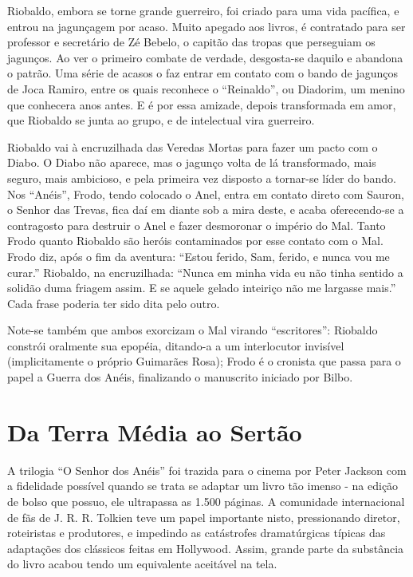 Riobaldo, embora se torne grande guerreiro, foi criado para uma vida
pacífica, e entrou na jagunçagem por acaso. Muito apegado aos livros,
é contratado para ser professor e secretário de Zé Bebelo, o capitão
das tropas que perseguiam os jagunços. Ao ver o primeiro combate de
verdade, desgosta-se daquilo e abandona o patrão. Uma série de acasos
o faz entrar em contato com o bando de jagunços de Joca Ramiro, entre
os quais reconhece o “Reinaldo”, ou Diadorim, um menino que conhecera
anos antes. E é por essa amizade, depois transformada em amor, que
Riobaldo se junta ao grupo, e de intelectual vira guerreiro. 

Riobaldo vai à encruzilhada das Veredas Mortas para fazer um pacto com
o Diabo. O Diabo não aparece, mas o jagunço volta de lá transformado,
mais seguro, mais ambicioso, e pela primeira vez disposto a tornar-se
líder do bando. Nos “Anéis”, Frodo, tendo colocado o Anel, entra em
contato direto com Sauron, o Senhor das Trevas, fica daí em diante
sob a mira deste, e acaba oferecendo-se a contragosto para destruir o
Anel e fazer desmoronar o império do Mal. Tanto Frodo quanto Riobaldo
são heróis contaminados por esse contato com o Mal. Frodo diz, após o
fim da aventura: “Estou ferido, Sam, ferido, e nunca vou me curar.”
Riobaldo, na encruzilhada: “Nunca em minha vida eu não tinha sentido
a solidão duma friagem assim. E se aquele gelado inteiriço não me
largasse mais.” Cada frase poderia ter sido dita pelo outro.

Note-se também que ambos exorcizam o Mal virando “escritores”:
Riobaldo constrói oralmente sua epopéia, ditando-a a um interlocutor
invisível (implicitamente o próprio Guimarães Rosa); Frodo é o
cronista que passa para o papel a Guerra dos Anéis, finalizando o
manuscrito iniciado por Bilbo.

\chapter{Da Terra Média ao Sertão}

A trilogia “O Senhor dos Anéis” foi trazida para o cinema por Peter
Jackson com a fidelidade possível quando se trata se adaptar um livro
tão imenso - na edição de bolso que possuo, ele ultrapassa as 1.500
páginas. A comunidade internacional de fãs de J. R. R. Tolkien teve
um papel importante nisto, pressionando diretor, roteiristas e
produtores, e impedindo as catástrofes dramatúrgicas típicas das
adaptações dos clássicos feitas em Hollywood. Assim, grande parte da
substância do livro acabou tendo um equivalente aceitável na tela.

